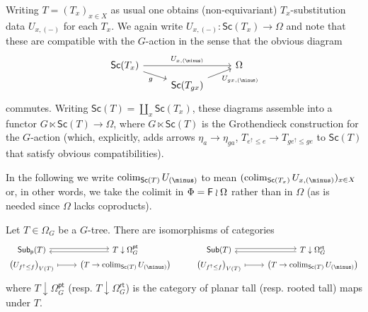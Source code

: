 \documentclass[a4paper,10pt]{article}%
\begin{document}
\begin{remark}\label{SUBSDATUMCONV REM}
%
	Writing $T = (T_x)_{x \in X}$ as usual
	one obtains (non-equivariant) $T_x$-substitution data 
	$U_{x,(\minus)}$ for each $T_x$.
	We again write
	$U_{x,(\minus)} \colon \mathsf{Sc}(T_x) \to \Omega$
	and note that these are compatible with the $G$-action in the sense that the obvious diagram
\[
\begin{tikzcd}[row sep =3pt]
	\mathsf{Sc}(T_x) \ar{rr}{U_{x,(\minus)}} \ar{rd}[swap]{g} &&
	\Omega
\\
	& \mathsf{Sc}(T_{gx}) \ar{ru}[swap]{U_{gx,(\minus)}}
\end{tikzcd}
\]
commutes.
Writing $\mathsf{Sc}(T) = \coprod_x \mathsf{Sc}(T_x)$,
these diagrams assemble into a functor
$G \ltimes \mathsf{Sc}(T) \to \Omega$,
where $G \ltimes \mathsf{Sc}(T)$ is the Grothendieck construction for the $G$-action
(which, explicitly, adds arrows 
$\eta_a \to \eta_{ga}$, 
$T_{e^{\uparrow} \leq e} \to T_{ge^{\uparrow} \leq ge}$
to $\mathsf{Sc}(T)$ that satisfy obvious compatibilities).
\end{remark}


In the following we write
$\colim_{\mathsf{Sc}(T)}U_{(\minus)}$
to mean
$(\colim_{\mathsf{Sc}(T_x)}U_{x,(\minus)})_{x \in X}$ or, in other words, we take the colimit 
in $\Phi = \mathsf{F} \wr \Omega$ rather than in $\Omega$
(as is needed since $\Omega$ lacks coproducts).


\begin{corollary}\label{SUBDATAUNDERPLANG COR}
Let $T \in \Omega_G$ be a $G$-tree. There are isomorphisms of categories
\[
\begin{tikzcd}[row sep =0pt]
	\mathsf{Sub}_{\mathsf{p}}(T) \ar[r,shift left=2pt] &
	T \downarrow \Omega_{G}^{\mathsf{pt}} \ar[l,shift left=2pt] &
	\mathsf{Sub}(T) \ar[r,shift left=2pt] &
	T \downarrow \Omega_{G}^{\mathsf{rt}} \ar[l,shift left=2pt]
\\
	\left(U_{f^{\uparrow} \leq f}\right)_{V(T)} \ar[r,mapsto] & 
	\left(T \to \colim_{\mathsf{Sc}(T)} U_{(\minus)}\right) &
	\left(U_{f^{\uparrow} \leq f}\right)_{V(T)} \ar[r,mapsto] & 
	\left(T \to \colim_{\mathsf{Sc}(T)} U_{(\minus)}\right)
\end{tikzcd}
\]
where $T \downarrow \Omega_G^{\mathsf{pt}}$ 
(resp. $T \downarrow \Omega_G^{\mathsf{rt}}$)
is the category of planar tall (resp. rooted tall) maps under $T$.
\end{corollary}
\end{document}
